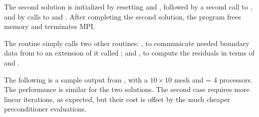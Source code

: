 The second solution is initialized by resetting  and ,
followed by a second call to , and by calls to  
and .  After completing the second solution, the
program frees memory and terminates MPI.

The  routine simply calls two other routines: ,
to communicate needed boundary data from  to an extension of it called
; and , to compute the residuals in terms of
 and .

The following is a sample output from , with a $10 \times 10$
mesh and  = 4 processors.  The performance is similar for the two
solutions.  The second case requires more linear iterations, as expected, 
but their cost is offset by the much cheaper preconditioner evaluations.


